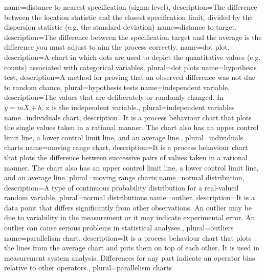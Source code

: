 {
    name={distance to nearest specification (sigma level)},
    description={The difference between the location statistic and the closest specification limit, divided by the dispersion statistic (e.g. the standard deviation)}
}
{
    name={distance to target},
    description={The difference between the specification target and the average is the difference you must adjust to aim the process correctly.}
}
{
    name={dot plot},
    description={A chart in which dots are used to depict the quantitative values (e.g. counts) associated with categorical variables},
    plural={dot plots}
}
{
    name={hypothesis test},
    description={A method for proving that an observed difference was not due to random chance},
    plural={hypothesis tests}
}
{
    name={independent variable},
    description={The values that are deliberately or randomly changed. In $y = mX + b$, x is the independent variable.},
    plural={independent variables}
}
{
    name={individuals chart},
    description={It is a process behaviour chart that plots the single values taken in a rational manner. The chart also has an upper control limit line, a lower control limit line, and an average line.},
    plural={individuals charts}
}
{
    name={moving range chart},
    description={It is a process behaviour chart that plots the difference between successive pairs of values taken in a rational manner. The chart also has an upper control limit line, a lower control limit line, and an average line.}
    plural={moving range charts}
}
{
    name={normal distribution},
    description={A type of continuous probability distribution for a real-valued random variable},
    plural={normal distributions}
}
{
    name={outlier},
    description={It is a data point that differs significantly from other observations. An outlier may be due to variability in the measurement or it may indicate experimental error. An outlier can cause serious problems in statistical analyses.},
    plural={outliers}
}
{
    name={parallelism chart},
    description={It is a process behaviour chart that plots the lines from the average chart and puts them on top of each other. It is used in measurement system analysis. Differences for any part indicate an operator bias relative to other operators.},
    plural={parallelism charts}
}
